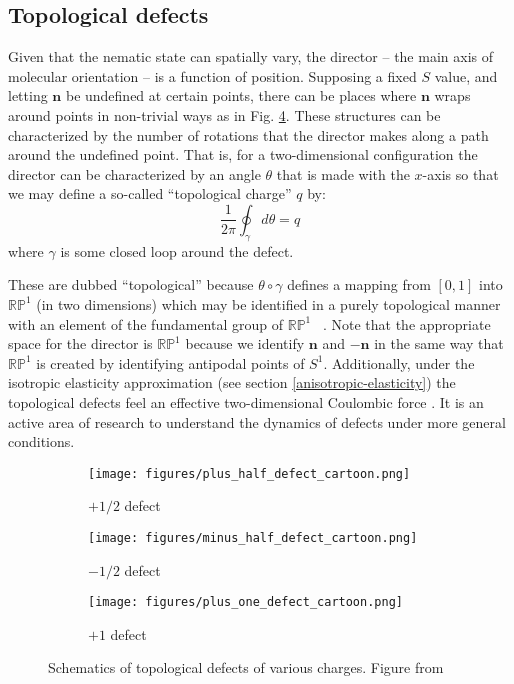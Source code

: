 \documentclass[reqno]{article}
\begin{document}
  \subsection{Topological defects}
  Given that the nematic state can spatially vary, the director
  -- the main axis of molecular orientation -- is a function of position.
  Supposing a fixed $S$ value, and letting $\mathbf{n}$ be undefined at certain
  points, there can be places where $\mathbf{n}$ wraps around points in
  non-trivial ways as in Fig. \ref{fig:defect-cartoons}.
  These structures can be characterized by the number of rotations that the
  director makes along a path around the undefined point.
  That is, for a two-dimensional configuration the director can be characterized
  by an angle $\theta$ that is made with the $x$-axis so that we may define a
  so-called ``topological charge'' $q$ by:
  \begin{equation}
    \frac{1}{2\pi} \oint_\gamma d \theta = q
  \end{equation}
  where $\gamma$ is some closed loop around the defect.

  These are dubbed ``topological'' because $\theta \circ \gamma$ defines a
  mapping from $[0, 1]$ into $\mathbb{RP}^1$ (in two dimensions) which may be identified in a purely
  topological manner with an element of the fundamental group of $\mathbb{RP}^1$
  ~\cite{mermin_topological_1979}.
  Note that the appropriate space for the director is $\mathbb{RP}^1$ because
  we identify $\mathbf{n}$ and $-\mathbf{n}$ in the same way that
  $\mathbb{RP}^1$ is created by identifying antipodal points of $S^1$.
  Additionally, under the isotropic elasticity approximation (see section
  \ref{anisotropic-elasticity}) the topological defects feel an effective
  two-dimensional Coulombic force \cite{selinger_introduction_2016}.
  It is an active area of research to understand the dynamics of defects under
  more general conditions.
  
  \begin{figure}[h]
    \centering
    \begin{subfigure}{0.3\textwidth}
      \texttt{[image: figures/plus\_half\_defect\_cartoon.png]}
      \caption{$+1/2$ defect}
      \label{fig:plus-half-defect-cartoon}
    \end{subfigure}
    \hfill
    \begin{subfigure}{0.3\textwidth}
      \texttt{[image: figures/minus\_half\_defect\_cartoon.png]}
      \caption{$-1/2$ defect}
      \label{fig:minus-half-defect-cartoon}
    \end{subfigure}
    \hfill
    \begin{subfigure}{0.3\textwidth}
      \texttt{[image: figures/plus\_one\_defect\_cartoon.png]}
      \caption{$+1$ defect}
      \label{fig:plus-one-defect-cartoon}
    \end{subfigure}
    \caption{Schematics of topological defects of various charges. Figure from ~\cite{foffano_dynamics_2014}}
    \label{fig:defect-cartoons}
  \end{figure}
\end{document}
